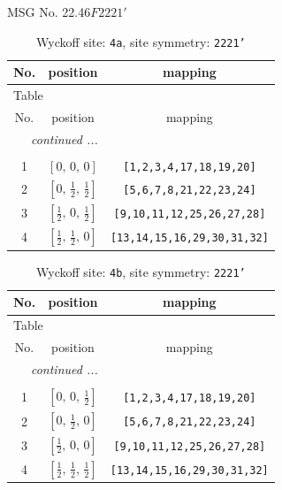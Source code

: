 \documentclass[fleqn,8pt]{jsarticle}
\begin{document}
\setcounter{MaxMatrixCols}{32}

\renewcommand{\tablename}{Table~}
\renewcommand{\figurename}{Figure~}
\begin{center}
\LARGE
MSG No. 22.46\quad$F2221'$
\end{center}
\renewcommand{\arraystretch}{1.2}
\begin{longtable}{ccc}
\caption{Wyckoff site: {\tt 4a}, site symmetry: {\tt 2221'}}
 \\
 \hline \hline
No. & position & mapping \\ \hline \endfirsthead

\multicolumn{2}{l}{\tablename\ \thetable{}} \\
 \hline \hline
No. & position & mapping \\ \hline \endhead

 \hline \hline
\multicolumn{2}{r}{\footnotesize\it continued ...} \\ \endfoot

 \hline \hline
\multicolumn{2}{r}{} \\ \endlastfoot

1 & $\left[ 0,\, 0,\, 0 \right]$ & {\tt [1,2,3,4,17,18,19,20]} \\ \hline
2 & $\left[ 0,\, \frac{1}{2},\, \frac{1}{2} \right]$ & {\tt [5,6,7,8,21,22,23,24]} \\ \hline
3 & $\left[ \frac{1}{2},\, 0,\, \frac{1}{2} \right]$ & {\tt [9,10,11,12,25,26,27,28]} \\ \hline
4 & $\left[ \frac{1}{2},\, \frac{1}{2},\, 0 \right]$ & {\tt [13,14,15,16,29,30,31,32]} \\
\end{longtable}
\renewcommand{\arraystretch}{1.2}
\begin{longtable}{ccc}
\caption{Wyckoff site: {\tt 4b}, site symmetry: {\tt 2221'}}
 \\
 \hline \hline
No. & position & mapping \\ \hline \endfirsthead

\multicolumn{2}{l}{\tablename\ \thetable{}} \\
 \hline \hline
No. & position & mapping \\ \hline \endhead

 \hline \hline
\multicolumn{2}{r}{\footnotesize\it continued ...} \\ \endfoot

 \hline \hline
\multicolumn{2}{r}{} \\ \endlastfoot

1 & $\left[ 0,\, 0,\, \frac{1}{2} \right]$ & {\tt [1,2,3,4,17,18,19,20]} \\ \hline
2 & $\left[ 0,\, \frac{1}{2},\, 0 \right]$ & {\tt [5,6,7,8,21,22,23,24]} \\ \hline
3 & $\left[ \frac{1}{2},\, 0,\, 0 \right]$ & {\tt [9,10,11,12,25,26,27,28]} \\ \hline
4 & $\left[ \frac{1}{2},\, \frac{1}{2},\, \frac{1}{2} \right]$ & {\tt [13,14,15,16,29,30,31,32]} \\
\end{longtable}
\end{document}
